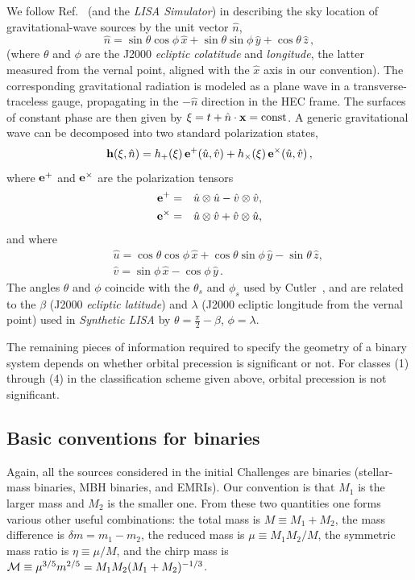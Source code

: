 \documentclass[11pt]{report}
\begin{document}
We follow Ref.\ \cite{cr2003} (and the \emph{LISA Simulator}) in describing the sky location of
gravitational-wave sources by the unit vector $\hat{n}$,
%
\begin{equation}
\hat{n} = \sin\theta \cos\phi \, \hat{x} + \sin \theta\sin\phi \, \hat{y}+\cos\theta
\, \hat{z}\,,
\end{equation}
%
(where $\theta$ and $\phi$ are the J2000 \emph{ecliptic colatitude} and \emph{longitude},
the latter measured from the vernal point, aligned with the $\hat{x}$ axis in our convention).
The corresponding gravitational radiation is modeled as a plane wave in a transverse-traceless gauge, propagating
in the %
$-\hat{n}$ direction in the HEC frame. The surfaces of constant phase are then
given by $\xi=t+\hat{n}\cdot {\bf x}={\rm const}$. A generic gravitational wave can be decomposed
into two standard polarization states,
%
\begin{equation}
\label{genh}
{\bf h}(\xi,\hat{n}) = h_{+}(\xi) \, {\bf e}^{+}(\hat{u},\hat{v}) + h_{\times}(\xi) \, {\bf e}^{\times}(\hat{u},\hat{v})\,,
\end{equation}
%
where ${\bf e}^{+}$ and ${\bf e}^{\times}$ are the polarization tensors
%
\begin{eqnarray}
\label{eten}
{\bf e}^{+} &=& \hat{u}\otimes \hat{u} - \hat{v}\otimes \hat{v},  \nonumber \\
{\bf e}^{\times} &=& \hat{u}\otimes \hat{v} + \hat{v}\otimes \hat{u},
\end{eqnarray}
%
and where
%
\begin{eqnarray}
\label{wave}
&&\hat{u} = \cos\theta\cos\phi \, \hat{x} +\cos\theta\sin\phi \,
\hat{y} -\sin\theta \, \hat{z}, \\
&&\hat{v} = \sin\phi \, \hat{x} -\cos\phi \, \hat{y} \, . \nonumber
\end{eqnarray}
%
The angles $\theta$ and $\phi$ coincide with the $\theta_s$ and $\phi_s$ used by Cutler~\cite{cutler98},
and are related to the $\beta$ (J2000 \emph{ecliptic latitude}) and $\lambda$ (J2000 ecliptic longitude from the vernal point) used in \emph{Synthetic LISA} \cite{synthlisa,vallis2005} by $\theta = \frac{\pi}{2} - \beta$, 
$\phi = \lambda$.

The remaining pieces of information required to specify the geometry of a binary system 
depends on whether orbital precession is significant or not.  For classes (1) through (4) in the classification scheme given above, orbital
precession is not significant.

\subsection{Basic conventions for binaries}
Again, all the sources considered in the initial Challenges are binaries (stellar-mass binaries, MBH binaries, and EMRIs). 
Our convention is that $M_1$ is the larger mass and $M_2$ is the smaller one. From these two quantities one forms various 
other useful combinations: the total mass is $M \equiv M_1 + M_2$, the mass difference is $\delta m = m_1-m_2$,
the reduced mass is $\mu \equiv M_1 M_2/M$, the symmetric mass ratio is 
$\eta \equiv \mu/M$, and the chirp mass is ${\cal M} \equiv \mu^{3/5} m^{2/5} = M_1 M_2 (M_1 + M_2)^{-1/3}$.
\end{document}
